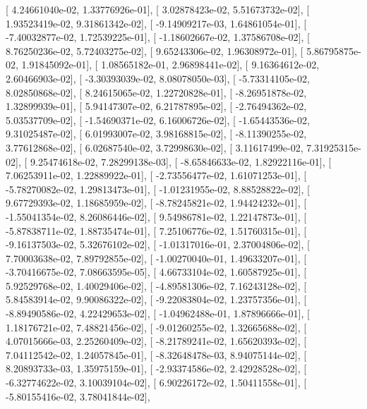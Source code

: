 \documentclass{article}
\begin{document}
       [  4.24661040e-02,   1.33776926e-01],
       [  3.02878423e-02,   5.51673732e-02],
       [  1.93523419e-02,   9.31861342e-02],
       [ -9.14909217e-03,   1.64861054e-01],
       [ -7.40032877e-02,   1.72539225e-01],
       [ -1.18602667e-02,   1.37586708e-02],
       [  8.76250236e-02,   5.72403275e-02],
       [  9.65243306e-02,   1.96308972e-01],
       [  5.86795875e-02,   1.91845092e-01],
       [  1.08565182e-01,   2.96898441e-02],
       [  9.16364612e-02,   2.60466903e-02],
       [ -3.30393039e-02,   8.08078050e-03],
       [ -5.73314105e-02,   8.02850868e-02],
       [  8.24615065e-02,   1.22720828e-01],
       [ -8.26951878e-02,   1.32899939e-01],
       [  5.94147307e-02,   6.21787895e-02],
       [ -2.76494362e-02,   5.03537709e-02],
       [ -1.54690371e-02,   6.16006726e-02],
       [ -1.65443536e-02,   9.31025487e-02],
       [  6.01993007e-02,   3.98168815e-02],
       [ -8.11390255e-02,   3.77612868e-02],
       [  6.02687540e-02,   3.72998630e-02],
       [  3.11617499e-02,   7.31925315e-02],
       [  9.25474618e-02,   7.28299138e-03],
       [ -8.65846633e-02,   1.82922116e-01],
       [  7.06253911e-02,   1.22889922e-01],
       [ -2.73556477e-02,   1.61071253e-01],
       [ -5.78270082e-02,   1.29813473e-01],
       [ -1.01231955e-02,   8.88528822e-02],
       [  9.67729393e-02,   1.18685959e-02],
       [ -8.78245821e-02,   1.94424232e-01],
       [ -1.55041354e-02,   8.26086446e-02],
       [  9.54986781e-02,   1.22147873e-01],
       [ -5.87838711e-02,   1.88735474e-01],
       [  7.25106776e-02,   1.51760315e-01],
       [ -9.16137503e-02,   5.32676102e-02],
       [ -1.01317016e-01,   2.37004806e-02],
       [  7.70003638e-02,   7.89792855e-02],
       [ -1.00270040e-01,   1.49633207e-01],
       [ -3.70416675e-02,   7.08663595e-05],
       [  4.66733104e-02,   1.60587925e-01],
       [  5.92529768e-02,   1.40029406e-02],
       [ -4.89581306e-02,   7.16243128e-02],
       [  5.84583914e-02,   9.90086322e-02],
       [ -9.22083804e-02,   1.23757356e-01],
       [ -8.89490586e-02,   4.22429653e-02],
       [ -1.04962488e-01,   1.87896666e-01],
       [  1.18176721e-02,   7.48821456e-02],
       [ -9.01260255e-02,   1.32665688e-02],
       [  4.07015666e-03,   2.25260409e-02],
       [ -8.21789241e-02,   1.65620393e-02],
       [  7.04112542e-02,   1.24057845e-01],
       [ -8.32648478e-03,   8.94075144e-02],
       [  8.20893733e-03,   1.35975159e-01],
       [ -2.93374586e-02,   2.42928528e-02],
       [ -6.32774622e-02,   3.10039104e-02],
       [  6.90226172e-02,   1.50411558e-01],
       [ -5.80155416e-02,   3.78041844e-02],
\end{document}
